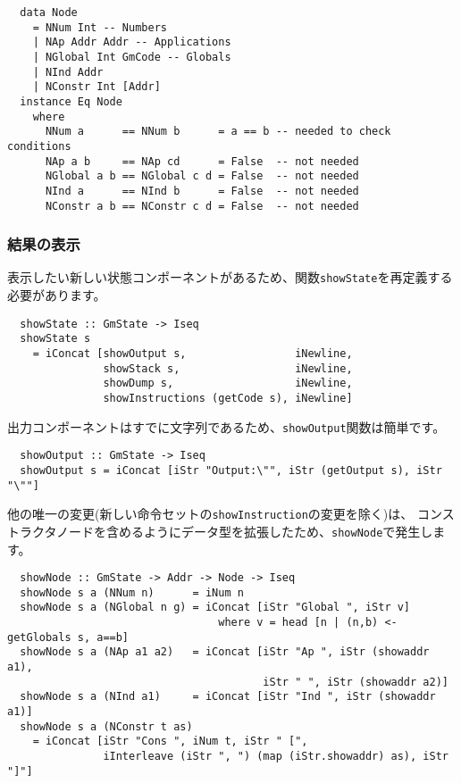 \documentclass{jarticle}
\begin{document}
\begin{verbatim}
  data Node
    = NNum Int -- Numbers
    | NAp Addr Addr -- Applications
    | NGlobal Int GmCode -- Globals
    | NInd Addr
    | NConstr Int [Addr]
  instance Eq Node
    where
      NNum a      == NNum b      = a == b -- needed to check conditions
      NAp a b     == NAp cd      = False  -- not needed
      NGlobal a b == NGlobal c d = False  -- not needed
      NInd a      == NInd b      = False  -- not needed
      NConstr a b == NConstr c d = False  -- not needed
\end{verbatim}

\subsubsection{結果の表示}

表示したい新しい状態コンポーネントがあるため、関数\texttt{showState}を再定義する必要があります。

\begin{verbatim}
  showState :: GmState -> Iseq
  showState s
    = iConcat [showOutput s,                 iNewline,
               showStack s,                  iNewline,
               showDump s,                   iNewline,
               showInstructions (getCode s), iNewline]
\end{verbatim}

出力コンポーネントはすでに文字列であるため、\texttt{showOutput}関数は簡単です。

\begin{verbatim}
  showOutput :: GmState -> Iseq
  showOutput s = iConcat [iStr "Output:\"", iStr (getOutput s), iStr "\""]
\end{verbatim}

他の唯一の変更(新しい命令セットの\texttt{showInstruction}の変更を除く)は、
コンストラクタノードを含めるようにデータ型を拡張したため、\texttt{showNode}で発生します。

\begin{verbatim}
  showNode :: GmState -> Addr -> Node -> Iseq
  showNode s a (NNum n)      = iNum n
  showNode s a (NGlobal n g) = iConcat [iStr "Global ", iStr v]
                                 where v = head [n | (n,b) <- getGlobals s, a==b]
  showNode s a (NAp a1 a2)   = iConcat [iStr "Ap ", iStr (showaddr a1),
                                        iStr " ", iStr (showaddr a2)]
  showNode s a (NInd a1)     = iConcat [iStr "Ind ", iStr (showaddr a1)]
  showNode s a (NConstr t as)
    = iConcat [iStr "Cons ", iNum t, iStr " [",
               iInterleave (iStr ", ") (map (iStr.showaddr) as), iStr "]"]
\end{verbatim}
\end{document}
